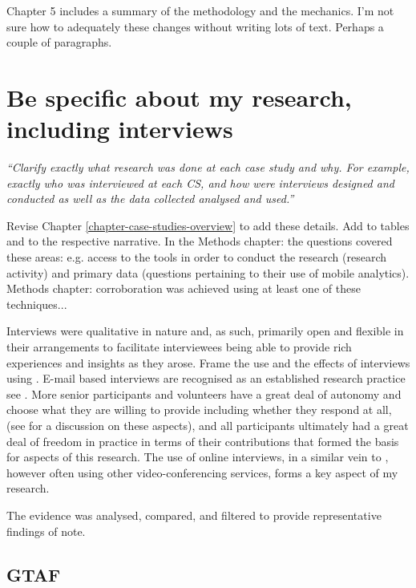 Chapter 5 includes a summary of the methodology and the mechanics. I'm not sure how to adequately these changes without writing lots of text. Perhaps a couple of paragraphs.

\section{Be specific about my research, including interviews}
\emph{``Clarify exactly what research was done at each case study and why. For example, exactly who was interviewed at each CS, and how were interviews designed and conducted as well as the data collected analysed and used.''}

Revise Chapter \ref{chapter-case-studies-overview} to add these details. Add to tables and to the respective narrative. In the Methods chapter: the questions covered these areas: e.g. access to the tools in order to conduct the research (research activity) and primary data (questions pertaining to their use  of mobile analytics). Methods chapter: corroboration was achieved using at least one of these techniques...

Interviews were qualitative in nature and, as such, primarily open and flexible in their arrangements to facilitate interviewees being able to provide rich experiences and insights as they arose. Frame the use and the effects of interviews using . E-mail based interviews are recognised as an established research practice see . More senior participants and volunteers have a great deal of autonomy and choose what they are willing to provide including whether they respond at all, (see  for a discussion on these aspects), and all participants ultimately had a great deal of freedom in practice in terms of their contributions that formed the basis for aspects of this research. The use of online interviews, in a similar vein to , however often using other video-conferencing services, forms a key aspect of my research.

The evidence was analysed, compared, and filtered to provide representative findings of note. 

\subsection{GTAF}

